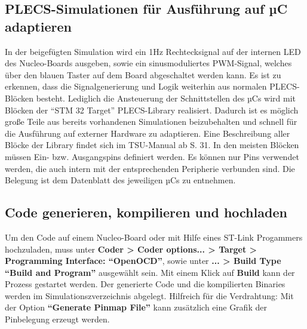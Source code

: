 \documentclass[a4paper,11pt,oneside]{article}
\begin{document}
\subsection*{PLECS-Simulationen für Ausführung auf µC adaptieren}
In der beigefügten Simulation wird ein 1Hz Rechtecksignal auf der internen LED des Nucleo-Boards ausgeben, sowie ein sinusmoduliertes PWM-Signal, welches über den blauen Taster auf dem Board abgeschaltet werden kann. Es ist zu erkennen, dass die Signalgenerierung und Logik weiterhin aus normalen PLECS-Blöcken besteht. Lediglich die Ansteuerung der Schnittstellen des µCs wird mit Blöcken der \enquote{STM 32 Target} PLECS-Library realisiert. Dadurch ist es möglich große Teile aus bereits vorhandenen Simulationen beizubehalten und schnell für die Ausführung auf externer Hardware zu adaptieren. Eine Beschreibung aller Blöcke der Library findet sich im TSU-Manual ab S. 31. In den meisten Blöcken müssen Ein- bzw. Ausgangspins definiert werden. Es können nur Pins verwendet werden, die auch intern mit der entsprechenden Peripherie verbunden sind. Die Belegung ist dem Datenblatt des jeweiligen µCs zu entnehmen.
\subsection*{Code generieren, kompilieren und hochladen}
\label{Codegenerieren}
Um den Code auf einem Nucleo-Board oder mit Hilfe eines ST-Link Progammers hochzuladen, muss unter \textbf{Coder > Coder options... > Target > Programming Interface: \enquote{OpenOCD}}, sowie unter \textbf{... > Build Type \enquote{Build and Program}} ausgewählt sein. Mit einem Klick auf \textbf{Build} kann der Prozess gestartet werden. Der generierte Code und die kompilierten Binaries werden im Simulationszverzeichnis abgelegt. Hilfreich für die Verdrahtung: Mit der Option \textbf{\enquote{Generate Pinmap File}} kann zusätzlich eine Grafik der Pinbelegung erzeugt werden.
\end{document}
